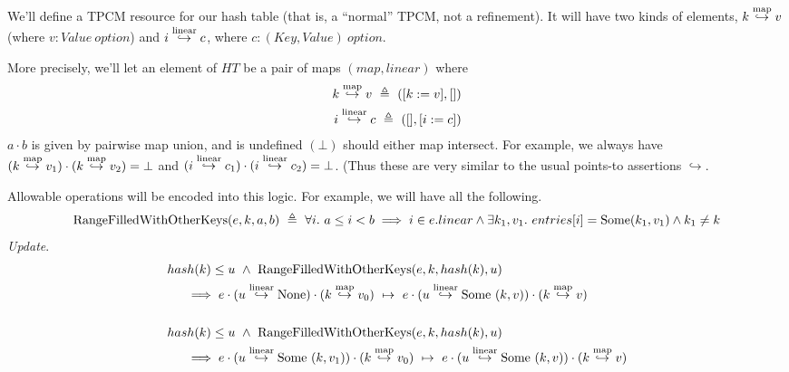 \documentclass{article}
\DeclareMathOperator{\RangeFilledWithOtherKeys}{RangeFilledWithOtherKeys}
\DeclareMathOperator{\SlotEmpty}{SlotEmpty}
\DeclareMathOperator{\SlotHasKey}{SlotHasKey}
\renewcommand{\eqdef}{\triangleq}
\newcommand{\pointsto}{\hookrightarrow}
\begin{document}
\newpage

We'll define a TPCM resource for our hash table (that is, a ``normal'' TPCM, not a refinement). It will have two kinds of elements, $k \stackrel{\text{map}}{\hookrightarrow} v$ (where $v : Value~option$)
and $i \stackrel{\text{linear}}{\hookrightarrow} c$, where $c : (Key,Value)~option$.

More precisely, we'll let an element of $HT$ be a pair of maps $(map, linear)$ where
\begin{align*}
k \hashto v ~\eqdef~ ([k := v], [])\\
i \entryto c ~\eqdef~ ([], [i := c])
\end{align*}
$a \cdot b$ is given by pairwise map union, and is undefined $(\bot)$ should either map intersect. For example, we always have $(k \stackrel{\text{map}}{\hookrightarrow} v_1) \cdot (k \stackrel{\text{map}}{\hookrightarrow} v_2) = \bot$
and $(i \stackrel{\text{linear}}{\hookrightarrow} c_1) \cdot (i \stackrel{\text{linear}}{\hookrightarrow} c_2) = \bot$. (Thus these are very similar to the usual points-to assertions $\pointsto$.

Allowable operations will be encoded into this logic. For example, we will have all the following.
\begin{align*}
  \RangeFilledWithOtherKeys(e, k, a, b) &~\eqdef~ \forall i .~ a \le i < b \implies i \in e.linear \land \exists k_1,v_1 .~ entries[i] = \Some (k_1,v_1) \land k_1 \ne k\\
\end{align*}
\emph{Update}.
\begin{align*}
  &\hash(k) \le u ~\land~ \RangeFilledWithOtherKeys(e, k, \hash(k), u)\\
      &~~~~\implies e \cdot (u \entryto \None) \cdot (k \hashto v_0) ~\mapsto~
                    e \cdot (u \entryto \Some~(k, v)) \cdot (k \hashto v)\\
  \\
  &\hash(k) \le u ~\land~ \RangeFilledWithOtherKeys(e, k, \hash(k), u)\\
      &~~~~\implies e \cdot (u \entryto \Some~(k, v_1)) \cdot (k \hashto v_0) ~\mapsto~
                    e \cdot (u \entryto \Some~(k, v)) \cdot (k \hashto v)
\end{align*}
\end{document}
